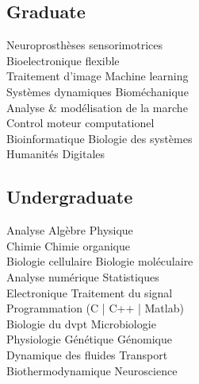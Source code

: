 \documentclass[a4paper]{cv}
\begin{document}
\hsepcol
\begin{minipage}[t]{0.33\textwidth}

\education

\coursework

\subsection{Graduate}
Neuroprosthèses sensorimotrices\\
Bioelectronique flexible\\
Traitement d'image \tbl{} Machine learning\\
Systèmes dynamiques \tbl{} Bioméchanique\\
Analyse \& modélisation de la marche\\
Control moteur computationel\\
Bioinformatique \tbl{} Biologie des systèmes\\
Humanités Digitales
\sectionspace

\subsection{Undergraduate}
Analyse \tbl{} Algèbre \tbl{} Physique\\
Chimie \tbl{} Chimie organique\\
Biologie cellulaire \tbl{} Biologie moléculaire\\
Analyse numérique \tbl{} Statistiques\\
Electronique \tbl{} Traitement du signal\\
Programmation (C | C++ | Matlab)\\
Biologie du dvpt \tbl{} Microbiologie\\
Physiologie \tbl{} Génétique \tbl{} Génomique\\
Dynamique des fluides \tbl{} Transport\\
Biothermodynamique \tbl{} Neuroscience
\sectionspace

\languages

\hobbies

\end{minipage}
\publications
\end{document}
